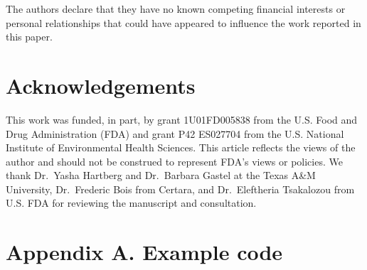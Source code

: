 \documentclass[preprint,12pt, a4paper]{elsarticle}
\begin{document}
The authors declare that they have no known competing financial interests or personal relationships that could have appeared to influence the work reported in this paper.

\section*{Acknowledgements}

This work was funded, in part, by grant 1U01FD005838 from the U.S. Food and Drug Administration (FDA) and grant P42 ES027704 from the U.S. National Institute of Environmental Health Sciences. This article reflects the views of the author and should not be construed to represent FDA's views or policies. We thank Dr.~Yasha Hartberg and Dr.~Barbara Gastel at the Texas A\&M University, Dr.~Frederic Bois from Certara, and Dr.~Eleftheria Tsakalozou from U.S. FDA for reviewing the manuscript and consultation.


\appendix
\section*{Appendix A. Example code}
\end{document}

